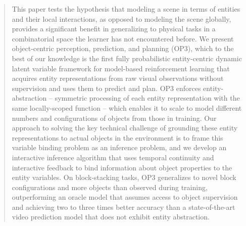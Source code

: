 \begin{abstract}
This paper tests the hypothesis that modeling a scene in terms of entities and their local interactions, as opposed to modeling the scene globally, provides a significant benefit in generalizing to physical tasks in a combinatorial space the learner has not encountered before. We present object-centric perception, prediction, and planning (OP3), which to the best of our knowledge is the first fully probabilistic entity-centric dynamic latent variable framework for model-based reinforcement learning that acquires entity representations from raw visual observations without supervision and uses them to predict and plan. OP3 enforces entity-abstraction -- symmetric processing of each entity representation with the same locally-scoped function -- which enables it to scale to model different numbers and configurations of objects from those in training. Our approach to solving the key technical challenge of grounding these entity representations to actual objects in the environment is to frame this variable binding problem as an inference problem, and we develop an interactive inference algorithm that uses temporal continuity and interactive feedback to bind information about object properties to the entity variables. On block-stacking tasks, OP3 generalizes to novel block configurations and more objects than observed during training, outperforming an oracle model that assumes access to object supervision and achieving two to three times better accuracy than a state-of-the-art video prediction model that does not exhibit entity abstraction.
\end{abstract}